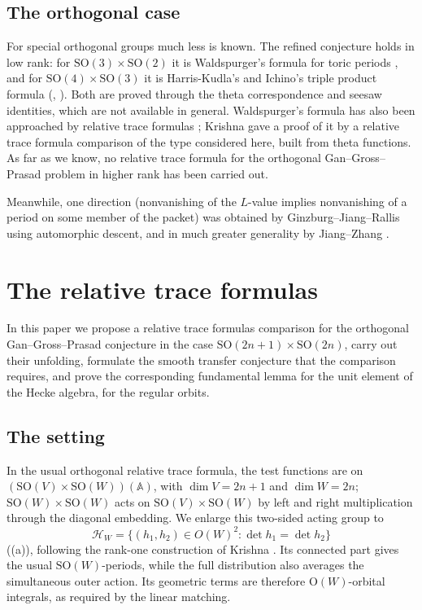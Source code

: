 \documentclass[11pt,oneside,notitlepage]{book}
\numberwithin{equation}{section}
\theoremstyle{plain}
\theoremstyle{definition}
\newcommand{\A}{\mathbb{A}}
\newcommand{\SO}{\mathrm{SO}}
\newcommand{\Ort}{\mathrm{O}}
\begin{document}
\subsection*{The orthogonal case}

For special orthogonal groups much less is known. The refined conjecture holds in low rank: for $\SO(3)\times\SO(2)$ it is Waldspurger's formula for toric periods \cite{Wal85}, and for $\SO(4)\times\SO(3)$ it is Harris-Kudla's and Ichino's triple product formula (\cite{HK}, \cite{Ich}). Both are proved through the theta correspondence and seesaw identities, which are not available in general. Waldspurger's formula has also been approached by relative trace formulas \cite{Jac86}; Krishna \cite{Krishna} gave a proof of it by a relative trace formula comparison of the type considered here, built from theta functions. As far as we know, no relative trace formula for the orthogonal Gan--Gross--Prasad problem in higher rank has been carried out. 

Meanwhile, one direction (nonvanishing of the $L$-value implies nonvanishing of a period on some member of the packet) was obtained by Ginzburg--Jiang--Rallis \cite{GJR} using automorphic descent, and in much greater generality by Jiang--Zhang \cite{JZ}.


\section{The relative trace formulas}

In this paper we propose a  relative trace formulas comparison for the orthogonal Gan--Gross--Prasad conjecture in the case $\SO(2n+1)\times\SO(2n)$, carry out their unfolding, formulate the smooth transfer conjecture that the comparison requires, and prove the corresponding fundamental lemma for the unit element of the Hecke algebra, for the regular orbits.

\subsection*{The setting}
In the usual orthogonal relative trace formula, the test functions are on $(\SO(V)\times\SO(W))(\A)$, with $\dim V=2n+1$ and $\dim W=2n$; \(\SO(W)\times\SO(W)\) acts on \(\SO(V)\times\SO(W)\) by left and right multiplication through the diagonal embedding. We enlarge this two-sided acting group to
\[
\mathcal H_W=\{(h_1,h_2)\in O(W)^2:\det h_1=\det h_2\}
\]
((a)), following the rank-one construction of Krishna \cite[\S4B]{Krishna}.
 Its connected part gives the usual $\SO(W)$-periods, while the full distribution also averages the simultaneous outer action. Its geometric terms are therefore $\Ort(W)$-orbital integrals, as required by the linear matching.
\end{document}
